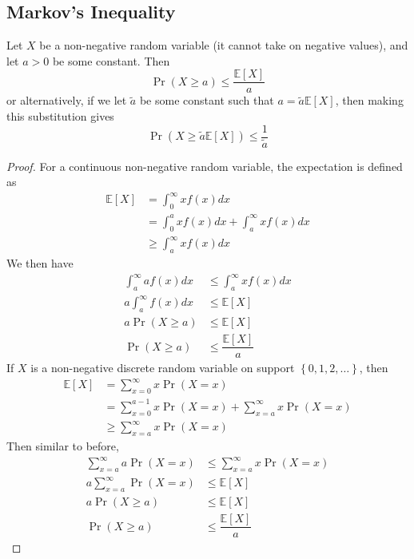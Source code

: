 \documentclass[11pt]{report} %
\begin{document}
\subsection{Markov's Inequality}

Let $X$ be a non-negative random variable (it cannot take on negative values), and let $a > 0$ be some constant. Then
\begin{equation}
\operatorname{Pr}\left(X\geq a\right) \leq \dfrac{\mathbb{E}\left[X\right]}{a}
\end{equation}
or alternatively, if we let $\tilde{a}$ be some constant such that $a = \tilde{a}\mathbb{E}\left[X\right]$, then making this substitution gives
\begin{equation}
\operatorname{Pr}\left(X\geq \tilde{a}\mathbb{E}\left[X\right]\right) \leq \dfrac{1}{\tilde{a}}
\end{equation}
\begin{proof}
For a continuous non-negative random variable, the expectation is defined as
\begin{align}
\mathbb{E}\left[X\right] &= \int_{0}^{\infty}xf\left(x\right)dx \\
&= \int_{0}^{a}xf\left(x\right)dx + \int_{a}^{\infty}xf\left(x\right)dx \\
&\geq \int_{a}^{\infty}xf\left(x\right)dx
\end{align}
We then have
\begin{align}
\int_{a}^{\infty}af\left(x\right)dx &\leq \int_{a}^{\infty}xf\left(x\right)dx \\
a\int_{a}^{\infty}f\left(x\right)dx &\leq \mathbb{E}\left[X\right] \\
a\operatorname{Pr}\left(X \geq a\right) &\leq \mathbb{E}\left[X\right] \\
\operatorname{Pr}\left(X \geq a\right) &\leq \dfrac{\mathbb{E}\left[X\right]}{a}
\end{align}
If $X$ is a non-negative discrete random variable on support $\left\{0, 1, 2, \dots\right\}$, then
\begin{align}
\mathbb{E}\left[X\right] &= \sum_{x = 0}^{\infty}x\operatorname{Pr}\left(X = x\right) \\
&= \sum_{x = 0}^{a - 1}x\operatorname{Pr}\left(X = x\right) + \sum_{x = a}^{\infty}x\operatorname{Pr}\left(X = x\right) \\
&\geq \sum_{x = a}^{\infty}x\operatorname{Pr}\left(X = x\right)
\end{align}
Then similar to before,
\begin{align}
\sum_{x = a}^{\infty}a\operatorname{Pr}\left(X = x\right) &\leq \sum_{x = a}^{\infty}x\operatorname{Pr}\left(X = x\right) \\
a\sum_{x = a}^{\infty}\operatorname{Pr}\left(X = x\right) &\leq \mathbb{E}\left[X\right] \\
a\operatorname{Pr}\left(X \geq a\right) &\leq \mathbb{E}\left[X\right] \\
\operatorname{Pr}\left(X \geq a\right) &\leq \dfrac{\mathbb{E}\left[X\right]}{a}
\end{align}
\end{proof}
\end{document}
